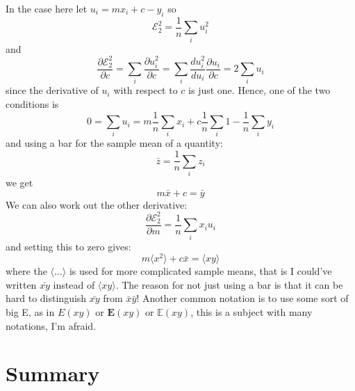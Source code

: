 \documentclass[12pt]{article}
\begin{document}
In the case here let $u_i=mx_i+c-y_i$ so
\begin{equation}
\mathcal{E}_2^2=\frac{1}{n}\sum_iu_i^2
\end{equation}
and
\begin{equation}
\frac{\partial \mathcal{E}_2^2}{\partial c}=\sum_i\frac{\partial u_i^2}{\partial c}=\sum_i\frac{d u_i^2}{du_i}\frac{\partial u_i}{\partial c}=2\sum_i u_i
\end{equation}
since the derivative of $u_i$ with respect to $c$ is just one. Hence,
one of the two conditions is
\begin{equation}
0=\sum_i u_i = m\frac{1}{n}\sum_i x_i + c\frac{1}{n}\sum_i 1-\frac{1}{n}\sum_i y_i
\end{equation}
and using a bar for the sample mean of a quantity:
\begin{equation}
\bar{z}=\frac{1}{n}\sum_i z_i
\end{equation}
we get
\begin{equation}
m\bar{x}+c=\bar{y}
\end{equation}
We can also work out the other derivative:
\begin{equation}
\frac{\partial \mathcal{E}_2^2}{\partial m}=\frac{1}{n}\sum_i x_iu_i
\end{equation}
and setting this to zero gives:
\begin{equation}
 m\langle x^2\rangle +c\bar{x}=\langle xy\rangle
\end{equation}
where the $\langle\ldots\rangle$ is used for more complicated sample
means, that is I could've written $\bar{xy}$ instead of $\langle
xy\rangle$. The reason for not just using a bar is that it can be hard
to distinguish $\bar{xy}$ from $\bar{x}\bar{y}$! Another common
notation is to use some sort of big E, as in $E(xy)$ or
$\mathbf{E}(xy)$ or $\mathbb{E}(xy)$, this is a subject with many
notations, I'm afraid.



\section*{Summary}
\end{document}
